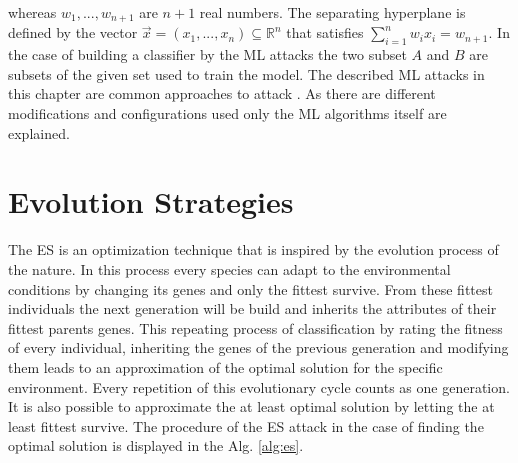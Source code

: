 whereas $w_1, ..., w_{n + 1}$ are $n + 1$ real numbers.
The separating hyperplane is defined by the vector $\vec{x} = (x_1, ..., x_n) \subseteq \mathbb{R}^n$ that satisfies $\sum_{i = 1}^{n} w_i x_i = w_{n + 1}$.%
In the case of building a classifier by the \ac{ML} attacks the two subset $A$ and $B$ are subsets of the given set used to train the model.
The described \ac{ML} attacks in this chapter are common approaches to attack \pufs \cite{Ruhrmair2014PUFOverview}.
As there are different modifications and configurations used only the \ac{ML} algorithms itself are explained.

% 
% 
% 

\section{Evolution Strategies}
\label{sec:evolutionstrategies}

The \acf{ES} is an optimization technique that is inspired by the evolution process of the nature.
In this process every species can adapt to the environmental conditions by changing its genes and only the fittest survive.
From these fittest individuals the next generation will be build and inherits the attributes of their fittest parents genes.
This repeating process of classification by rating the fitness of every individual, inheriting the genes of the previous generation and modifying them leads to an approximation of the optimal solution for the specific environment.
Every repetition of this evolutionary cycle counts as one generation.	%
It is also possible to approximate the at least optimal solution by letting the at least fittest survive.
The procedure of the \ac{ES} attack in the case of finding the optimal solution is displayed in the Alg. \ref{alg:es}.

